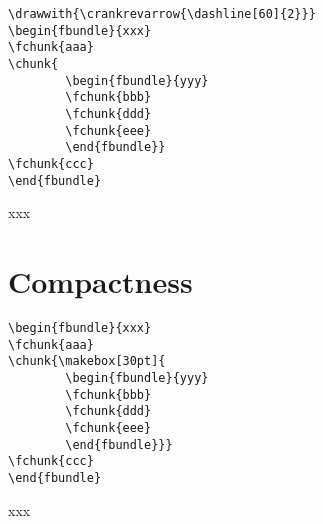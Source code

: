 \vspace{1cm}
\noindent\begin{minipage}{0.6\textwidth}
\begin{verbatim}
\drawwith{\crankrevarrow{\dashline[60]{2}}}
\begin{fbundle}{xxx}
\fchunk{aaa}
\chunk{
        \begin{fbundle}{yyy}
        \fchunk{bbb}
        \fchunk{ddd}
        \fchunk{eee}
        \end{fbundle}}
\fchunk{ccc}
\end{fbundle}
\end{verbatim}
\end{minipage}\begin{minipage}{0.4\textwidth}
\begin{fbundle}{xxx}
\end{fbundle}
\end{minipage}

\section{Compactness}

\begin{minipage}{0.6\textwidth}
\begin{verbatim}
\begin{fbundle}{xxx}
\fchunk{aaa}
\chunk{\makebox[30pt]{
        \begin{fbundle}{yyy}
        \fchunk{bbb}
        \fchunk{ddd}
        \fchunk{eee}
        \end{fbundle}}}
\fchunk{ccc}
\end{fbundle}
\end{verbatim}
\end{minipage}\begin{minipage}{0.4\textwidth}
\drawwith{\drawline}
\begin{fbundle}{xxx}
\end{fbundle}
\end{minipage}



